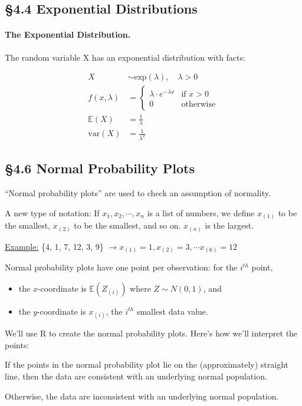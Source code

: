 \documentclass[../Notes.tex]{subfiles}
\begin{document}
    \subsection*{\S 4.4 Exponential Distributions}

    \paragraph*{The Exponential Distribution.} The random variable X has an exponential distribution with facts:

    \begin{align}
        X               & \sim \text{exp}(\lambda), \quad \lambda > 0                       \\
        f(x, \lambda)   & =
                                \begin{cases}
                                    \lambda\cdot e^{-\lambda x} & \text{if } x > 0          \\
                                    0   & \text{otherwise}
                                \end{cases}                                                 \\
        \mathbb{E}(X)   & = \frac{1}{\lambda}                                               \\
        \text{var}(X)   & = \frac{1}{\lambda^{2}}                                           
    \end{align}

    \subsection*{\S 4.6 Normal Probability Plots}

    ``Normal probability plots'' are used to check an assumption of normality.

    A new type of notation: If $x_{1}, x_{2}, \cdots, x_{n}$ is a list of numbers, we define $x_{(1)}$ to be the smallest, $x_{(2)}$ to be the smallest, and so on. $x_{(n)}$ is the largest.

    \underline{Example:} \{4, 1, 7, 12, 3, 9\} $\rightarrow x_{(1)} = 1, x_{(2)} = 3, \cdots x_{(6)} = 12$

    Normal probability plots have one point per observation: for the $i^{th}$ point,
    \begin{itemize}
        \item the $x$-coordinate is $\mathbb{E}(Z_{(i)})$ where $Z \sim N(0,1)$, and
        \item the $y$-coordinate is $x_{(i)}$, the $i^{th}$ smallest data value.
    \end{itemize}

    We'll use R to create the normal probability plots. Here's how we'll interpret the points:

    If the points in the normal probability plot lie on the (approximately) straight line, then the data are consistent with an underlying normal population.

    Otherwise, the data are inconsistent with an underlying normal population.

    
\end{document}
